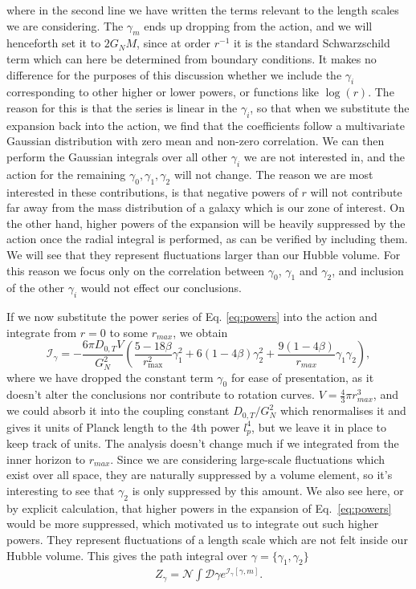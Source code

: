 \documentclass[aps,pra,amsmath,amssymb,amsthm,floatfix,nofootinbib,notitlepage,superscriptaddress,10pt]{revtex4-2}
\def\actionC{\mathcal{I}}
\begin{document}
where in the second line we have written the terms relevant to the length scales we are considering. The $\gamma_m$ ends up dropping from the action, and we will henceforth set it to $2G_N M$, since at order $r^{-1}$ it is the standard Schwarzschild term which can here be determined from boundary conditions. It makes no difference for the purposes of this discussion whether we include the $\gamma_i$ corresponding to other higher or lower powers, or  functions like  $\log(r)$. The reason for this is that the series is linear in the $\gamma_i$, so that when we substitute the expansion back into the action, we find that the coefficients follow a multivariate Gaussian distribution with zero mean and non-zero correlation.  We can then perform the Gaussian integrals over all other $\gamma_i$ we are not interested in, and the action for the remaining $\gamma_0,\gamma_1,\gamma_2$ will not change. The reason we are most interested in these contributions, is that negative powers of $r$ will not contribute far away from the mass distribution of a galaxy which is our zone of interest. On the other hand, higher powers of the expansion will be heavily suppressed by the action once the radial integral is performed, as can be verified by including them. We will see that they represent fluctuations larger than our Hubble volume. For this reason we focus  only on the correlation between $\gamma_0$, $\gamma_1$ and $\gamma_2$, and inclusion of the other $\gamma_i$ would not effect our conclusions. 


If we now substitute the power series of Eq. \eqref{eq:powers} into the action and integrate from $r=0$ to some $r_{max}$, we obtain
\begin{equation}
\label{eq:OurAction}
   \mathcal{I}_\gamma=-\frac{6 \pi  D_{0,T} V}{G_N^2} \left(\frac{5-18 \beta}{r_{\max}^2} \gamma_1^2+6 (1-4 \beta) \gamma_2^2+\frac{9(1-4 \beta )}{r_{max}} \gamma_1 \gamma_2 \right),
\end{equation}
where we have dropped the constant term $\gamma_0$ for ease of presentation, as it doesn't alter the conclusions nor contribute to rotation curves. 
$V=\frac{4}{3}\pi r_{max}^3$, and we could absorb it into the coupling constant $D_{0,T}/G_N^2$ 
which renormalises it and gives it units of Planck length to the 4th power $l_p^4$, but we leave it in place to keep track of units. The analysis doesn't change much if we integrated from the inner horizon to $r_{max}$. Since we are considering large-scale fluctuations which exist over all space, they are naturally suppressed by a volume element, so it's interesting to see that $\gamma_2$ is only suppressed by this amount. We also see here, or by explicit calculation, that higher powers in the expansion of Eq.~\eqref{eq:powers} would be more suppressed, which motivated us to integrate out such higher powers. They represent fluctuations of a length scale which are not felt inside our Hubble volume. This gives the path integral over $\gamma=\{\gamma_1,\gamma_2\}$
\begin{align}
    Z_\gamma=\mathcal{N}\int \mathcal{D}\gamma e^{\actionC_\gamma[\gamma,m]}.
    \label{eq: Zgamma}
\end{align}
\end{document}
